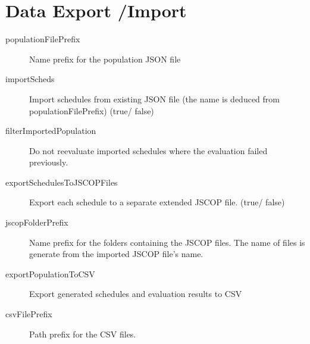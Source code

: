 \documentclass{article}
\begin{document}
\section{Data Export /Import}
\begin{description}
  \item[populationFilePrefix] Name prefix for the population JSON file
  \item[importScheds] Import schedules from existing JSON file (the name is
    deduced from populationFilePrefix) (true/ false)
  \item[filterImportedPopulation] Do not reevaluate imported schedules where
    the evaluation failed previously.

  \item[exportSchedulesToJSCOPFiles] Export each schedule to a separate
    extended JSCOP file. (true/ false)
  \item[jscopFolderPrefix] Name prefix for the folders containing the JSCOP
    files. The name of files is generate from the imported JSCOP file's name.
  \item[exportPopulationToCSV] Export generated schedules and evaluation
    results to CSV
  \item[csvFilePrefix] Path prefix for the CSV files.
\end{description}
\end{document}

